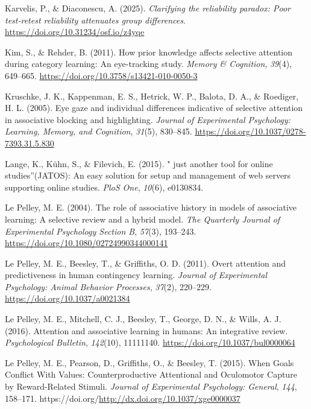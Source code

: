 \documentclass[
  man,
  floatsintext,
  longtable,
  nolmodern,
  notxfonts,
  notimes,
  mask,
  colorlinks=true,linkcolor=blue,citecolor=blue,urlcolor=blue]{apa7}
\newlength{\cslhangindent}
\newenvironment{CSLReferences}[2] %
 {\begin{list}{}{%
  \setlength{\itemindent}{0pt}
  \setlength{\leftmargin}{0pt}
  \setlength{\parsep}{0pt}
  \ifodd #1
   \setlength{\leftmargin}{\cslhangindent}
   \setlength{\itemindent}{-1\cslhangindent}
  \fi
  \setlength{\itemsep}{#2\baselineskip}}}
 {\end{list}}
\begin{document}
\begin{CSLReferences}{1}{0}
Karvelis, P., \& Diaconescu, A. (2025). \emph{Clarifying the reliability
paradox: Poor test-retest reliability attenuates group differences}.
\url{https://doi.org/10.31234/osf.io/z4yqe}

Kim, S., \& Rehder, B. (2011). How prior knowledge affects selective
attention during category learning: An eye-tracking study. \emph{Memory
\& Cognition}, \emph{39}(4), 649--665.
\url{https://doi.org/10.3758/s13421-010-0050-3}

Kruschke, J. K., Kappenman, E. S., Hetrick, W. P., Balota, D. A., \&
Roediger, H. L. (2005). Eye gaze and individual differences indicative
of selective attention in associative blocking and highlighting.
\emph{Journal of Experimental Psychology: Learning, Memory, and
Cognition}, \emph{31}(5), 830--845.
\url{https://doi.org/10.1037/0278-7393.31.5.830}

Lange, K., Kühn, S., \& Filevich, E. (2015). {"} just another tool for
online studies{''}(JATOS): An easy solution for setup and management of
web servers supporting online studies. \emph{PloS One}, \emph{10}(6),
e0130834.

Le Pelley, M. E. (2004). The role of associative history in models of
associative learning: A selective review and a hybrid model. \emph{The
Quarterly Journal of Experimental Psychology Section B}, \emph{57}(3),
193--243. \url{https://doi.org/10.1080/02724990344000141}

Le Pelley, M. E., Beesley, T., \& Griffiths, O. D. (2011). Overt
attention and predictiveness in human contingency learning.
\emph{Journal of Experimental Psychology: Animal Behavior Processes},
\emph{37}(2), 220--229. \url{https://doi.org/10.1037/a0021384}

Le Pelley, M. E., Mitchell, C. J., Beesley, T., George, D. N., \& Wills,
A. J. (2016). Attention and associative learning in humans: An
integrative review. \emph{Psychological Bulletin}, \emph{142}(10),
11111140. \url{https://doi.org/10.1037/bul0000064}

Le Pelley, M. E., Pearson, D., Griffiths, O., \& Beesley, T. (2015).
When Goals Conflict With Values: Counterproductive Attentional and
Oculomotor Capture by Reward-Related Stimuli. \emph{Journal of
Experimental Psychology: General}, \emph{144}, 158--171.
https://doi.org/\url{http://dx.doi.org/10.1037/xge0000037}


\end{CSLReferences}
\end{document}
